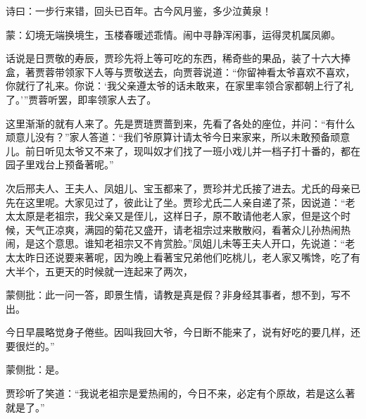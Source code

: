 
\begin{parag}

    诗曰：一步行来错，回头已百年。古今风月鉴，多少泣黄泉！
\end{parag}


\begin{parag}


    \begin{note}蒙：幻境无端换境生，玉楼春暖述乖情。闹中寻静浑闲事，运得灵机属凤卿。\end{note}
\end{parag}

\begin{parag}

    话说是日贾敬的寿辰，贾珍先将上等可吃的东西，稀奇些的果品，装了十六大捧盒，著贾蓉带领家下人等与贾敬送去，向贾蓉说道：“你留神看太爷喜欢不喜欢，你就行了礼来。你说：‘我父亲遵太爷的话未敢来，在家里率领合家都朝上行了礼了。’”贾蓉听罢，即率领家人去了。
\end{parag}


\begin{parag}


    这里渐渐的就有人来了。先是贾琏贾蔷到来，先看了各处的座位，并问：“有什么顽意儿没有？”家人答道：“我们爷原算计请太爷今日来家来，所以未敢预备顽意儿。前日听见太爷又不来了，现叫奴才们找了一班小戏儿并一档子打十番的，都在园子里戏台上预备著呢。”
\end{parag}


\begin{parag}


    次后邢夫人、王夫人、凤姐儿、宝玉都来了，贾珍并尤氏接了进去。尤氏的母亲已先在这里呢。大家见过了，彼此让了坐。贾珍尤氏二人亲自递了茶，因说道：“老太太原是老祖宗，我父亲又是侄儿，这样日子，原不敢请他老人家，但是这个时候，天气正凉爽，满园的菊花又盛开，请老祖宗过来散散闷，看著众儿孙热闹热闹，是这个意思。谁知老祖宗又不肯赏脸。”凤姐儿未等王夫人开口，先说道：“老太太昨日还说要来著呢，因为晚上看著宝兄弟他们吃桃儿，老人家又嘴馋，吃了有大半个，五更天的时候就一连起来了两次，\begin{note}蒙侧批：此一问一答，即景生情，请教是真是假？非身经其事者，想不到，写不出。\end{note}今日早晨略觉身子倦些。因叫我回大爷，今日断不能来了，说有好吃的要几样，还要很烂的。”\begin{note}蒙侧批：是。\end{note}贾珍听了笑道：“我说老祖宗是爱热闹的，今日不来，必定有个原故，若是这么著就是了。”
\end{parag}


